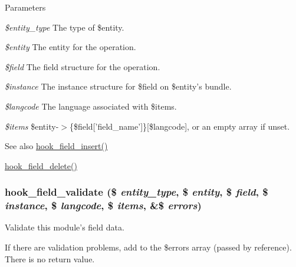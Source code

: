 \begin{DoxyParams}{Parameters}
\item[{\em \$entity\_\-type}]The type of \$entity. \item[{\em \$entity}]The entity for the operation. \item[{\em \$field}]The field structure for the operation. \item[{\em \$instance}]The instance structure for \$field on \$entity's bundle. \item[{\em \$langcode}]The language associated with \$items. \item[{\em \$items}]\$entity-\/$>$\{\$field\mbox{[}'field\_\-name'\mbox{]}\}\mbox{[}\$langcode\mbox{]}, or an empty array if unset.\end{DoxyParams}
\begin{DoxySeeAlso}{See also}
\hyperlink{group__field__types_ga2d29ec2e4a47170d5aaaf41bdd4813df}{hook\_\-field\_\-insert()} 

\hyperlink{group__field__types_gaf1e5787044b83d34cf7daed3d5297336}{hook\_\-field\_\-delete()} 
\end{DoxySeeAlso}
\hypertarget{group__field__types_gaa7d8846e8fe3766e1b3435cd50b965be}{
\subsubsection[{hook\_\-field\_\-validate}]{\setlength{\rightskip}{0pt plus 5cm}hook\_\-field\_\-validate (\$ {\em entity\_\-type}, \/  \$ {\em entity}, \/  \$ {\em field}, \/  \$ {\em instance}, \/  \$ {\em langcode}, \/  \$ {\em items}, \/  \&\$ {\em errors})}}
\label{group__field__types_gaa7d8846e8fe3766e1b3435cd50b965be}
Validate this module's field data.

If there are validation problems, add to the \$errors array (passed by reference). There is no return value.


